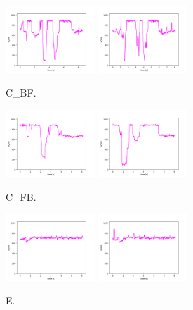 \begin{figure}[!ht]
\begin{center}
\includegraphics[width=0.3\textwidth]{../data/C_BF/C_BF_2.png}
\includegraphics[width=0.3\textwidth]{../data/C_BF/C_BF_3.png}
\caption{C\_BF.\label{fig:C_BF}}
\end{center}
\end{figure}

\begin{figure}[!ht]
\begin{center}
\includegraphics[width=0.3\textwidth]{../data/C_FB/C_FB_2.png}
\includegraphics[width=0.3\textwidth]{../data/C_FB/C_FB_3.png}
\caption{C\_FB.\label{fig:C_FB}}
\end{center}
\end{figure}

\begin{figure}[!ht]
\begin{center}
\includegraphics[width=0.3\textwidth]{../data/E2/E2_2.png}
\includegraphics[width=0.3\textwidth]{../data/E2/E2_3.png}
\caption{E.\label{fig:C_FB}}
\end{center}
\end{figure}


